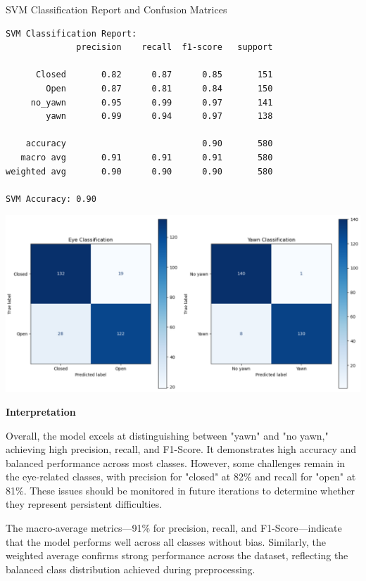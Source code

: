 \documentclass{modeleRapport}
\begin{document}
\begin{codebox}[OutputC]{ SVM Classification Report and Confusion Matrices}
\begin{verbatim}
SVM Classification Report:
              precision    recall  f1-score   support

      Closed       0.82      0.87      0.85       151
        Open       0.87      0.81      0.84       150
     no_yawn       0.95      0.99      0.97       141
        yawn       0.99      0.94      0.97       138

    accuracy                           0.90       580
   macro avg       0.91      0.91      0.91       580
weighted avg       0.90      0.90      0.90       580

SVM Accuracy: 0.90
\end{verbatim}

\includegraphics[width=15cm]{Images/SVM_cm.png}

\end{codebox}

\textbf{Interpretation\\}


Overall, the model excels at distinguishing between "yawn" and "no yawn," achieving high precision, recall, and F1-Score. It demonstrates high accuracy and balanced performance across most classes. However, some challenges remain in the eye-related classes, with precision for "closed" at 82\% and recall for "open" at 81\%. These issues should be monitored in future iterations to determine whether they represent persistent difficulties.

The macro-average metrics—91\% for precision, recall, and F1-Score—indicate that the model performs well across all classes without bias. Similarly, the weighted average confirms strong performance across the dataset, reflecting the balanced class distribution achieved during preprocessing.
\end{document}
